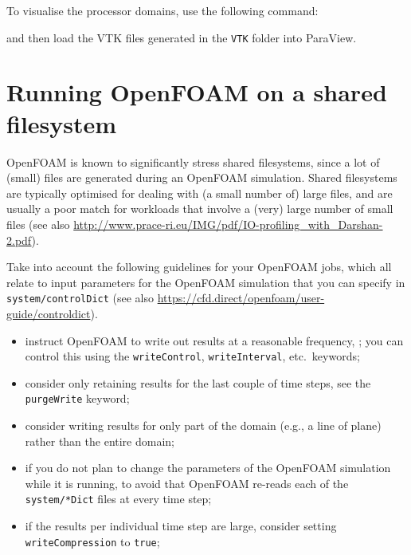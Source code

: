 To visualise the processor domains, use the following command:

\begin{prompt}
\end{prompt}

and then load the VTK files generated in the \lstinline|VTK| folder into ParaView.

\section{Running OpenFOAM on a shared filesystem}
\label{sec:best-practices-openfoam-shared-filesystems}

OpenFOAM is known to significantly stress shared filesystems, since a lot of (small) files are generated
during an OpenFOAM simulation. Shared filesystems are typically optimised for dealing with (a small number of)
large files, and are usually a poor match for workloads that involve a (very) large number of small files
(see also \url{http://www.prace-ri.eu/IMG/pdf/IO-profiling_with_Darshan-2.pdf}).

Take into account the following guidelines for your OpenFOAM jobs, which all relate to input parameters
for the OpenFOAM simulation that you can specify in \lstinline|system/controlDict|
(see also \url{https://cfd.direct/openfoam/user-guide/controldict}).

\begin{itemize}
\item instruct OpenFOAM to write out results at a reasonable frequency, ; you can control this using the \lstinline|writeControl|,
    \lstinline|writeInterval|, etc.\ keywords;
\item consider only retaining results for the last couple of time steps, see the \lstinline|purgeWrite| keyword;
\item consider writing results for only part of the domain (e.g., a line of plane) rather than the entire domain;
\item if you do not plan to change the parameters of the OpenFOAM simulation while it is running,
       to avoid that OpenFOAM re-reads
      each of the \lstinline|system/*Dict| files at every time step;
\item if the results per individual time step are large, consider setting \lstinline|writeCompression| to
      \lstinline|true|;
\end{itemize}

